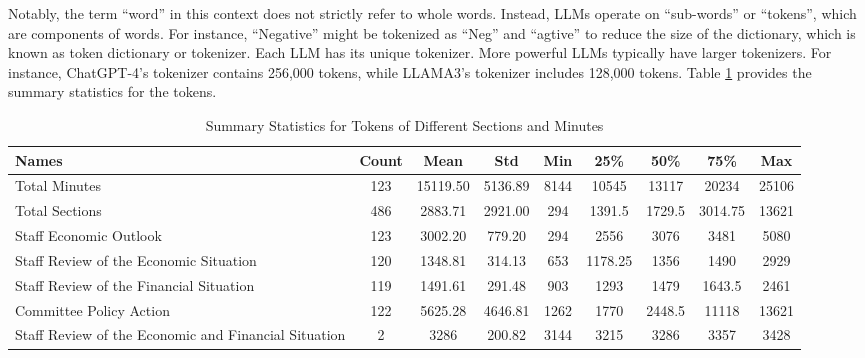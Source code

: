 Notably, the term ``word'' in this context does not strictly refer to whole words. Instead, LLMs operate on ``sub-words'' or ``tokens'', which are components of words. For instance, ``Negative'' might be tokenized as ``Neg'' and ``agtive'' to reduce the size of the dictionary, which is known as token dictionary or tokenizer. Each LLM has its unique tokenizer. More powerful LLMs typically have larger tokenizers. For instance, ChatGPT-4's tokenizer contains 256,000 tokens, while LLAMA3's tokenizer includes 128,000 tokens. Table \ref{tab:ch2:summary_statis} provides the summary statistics for the tokens.


\begin{table}[h]
    \scriptsize
    \centering
    \begin{tabular}{p{3.8cm}cccccccc}
        \toprule
        Names&                                                Count&	    Mean&	    Std&	 Min&	   25\%&	  50\%&	   75\%&	Max \\
        \hline
        Total Minutes&	                                        123&	15119.50&	5136.89&	8144&	  10545&	 13117&	  20234&	25106 \\
        Total Sections&	                                        486&	 2883.71&	2921.00&	 294&	 1391.5&	1729.5&	3014.75&	13621\\
        Staff Economic Outlook&	                                123&	 3002.20&	 779.20&	 294&	   2556&	  3076&	   3481&	5080 \\
        Staff Review of the Economic Situation&	                120&	 1348.81&	 314.13&	 653&	1178.25&	  1356&	   1490&	2929 \\
        Staff Review of the Financial Situation&	            119&	 1491.61&	 291.48&	 903&	   1293&	  1479&	 1643.5&	2461 \\
        Committee Policy Action&	                            122&	 5625.28&	4646.81&	1262&	   1770&	2448.5&	  11118&	13621 \\
        Staff Review of the Economic and Financial Situation&	  2&	    3286&	 200.82&	3144&	   3215&	  3286&	   3357&	3428 \\
        \bottomrule
    \end{tabular}
    \caption{Summary Statistics for Tokens of Different Sections and Minutes}
    \label{tab:ch2:summary_statis}
\end{table}


